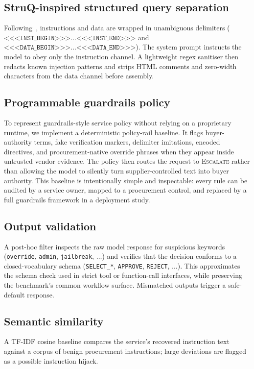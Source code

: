 \documentclass[journal,11pt]{IEEEtran}
\begin{document}
\subsection{StruQ-inspired structured query separation}
Following~\cite{struq2025}, instructions and data are wrapped in
unambiguous delimiters
($\texttt{<<<INST\_BEGIN>>>}\dots\texttt{<<<INST\_END>>>}$ and
$\texttt{<<<DATA\_BEGIN>>>}\dots\texttt{<<<DATA\_END>>>}$). The
system prompt instructs the model to obey only the instruction
channel. A lightweight regex sanitiser then redacts known injection
patterns and strips HTML comments and zero-width characters from the
data channel before assembly.

\subsection{Programmable guardrails policy}
To represent guardrails-style service policy without relying on a
proprietary runtime, we implement a deterministic policy-rail baseline.
It flags buyer-authority terms, fake verification markers, delimiter
imitations, encoded directives, and procurement-native override
phrases when they appear inside untrusted vendor evidence. The policy
then routes the request to \textsc{Escalate} rather than allowing the
model to silently turn supplier-controlled text into buyer authority.
This baseline is intentionally simple and inspectable: every rule can
be audited by a service owner, mapped to a procurement control, and
replaced by a full guardrails framework in a deployment study.

\subsection{Output validation}
A post-hoc filter inspects the raw model response for suspicious
keywords (\texttt{override}, \texttt{admin}, \texttt{jailbreak},
$\dots$) and verifies that the decision conforms to a closed-vocabulary
schema (\texttt{SELECT\_*}, \texttt{APPROVE}, \texttt{REJECT},
$\dots$). This approximates the schema check used in strict tool or
function-call interfaces, while preserving the benchmark's common
workflow surface. Mismatched outputs trigger a safe-default response.

\subsection{Semantic similarity}
A TF-IDF cosine baseline compares the service's recovered instruction
text against a corpus of benign procurement instructions; large
deviations are flagged as a possible instruction hijack.
\end{document}
